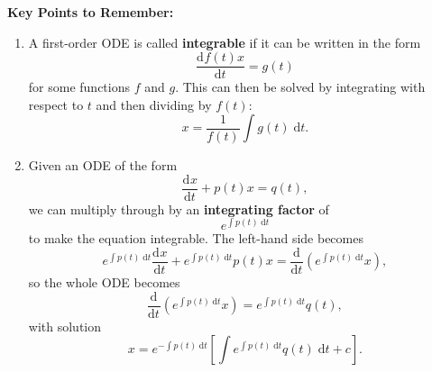 \documentclass{article}
\newcommand{\deriv}[3][]{\frac{\mathrm{d}^{#1}#2}{\mathrm{d}#3^{#1}}}
\newcommand{\diff}{\;\mathrm{d}}
\begin{document}
{\bf Key Points to Remember:}

\vspace{5mm}

\begin{enumerate}
	\item A first-order ODE is called \textbf{integrable} if it can be written in the form
		\[\deriv{f(t)x}{t} = g(t)\]
		for some functions $f$ and $g$. This can then be solved by integrating with respect to $t$ and then dividing by $f(t)$:
		\[x=\frac{1}{f(t)}\int g(t)\diff t.\]
	\item Given an ODE of the form
		\[\deriv{x}{t}+p(t)x=q(t),\]
		we can multiply through by an \textbf{integrating factor} of
		\[e^{\int\! p(t)\!\diff t}\]
		to make the equation integrable. The left-hand side becomes
		\[e^{\int\! p(t)\!\diff t}\deriv{x}{t}+e^{\int\! p(t)\!\diff t}p(t)x = \deriv{}{t}\left(e^{\int\! p(t)\!\diff t}x\right),\]
		so the whole ODE becomes
		\[\deriv{}{t}\left(e^{\int\! p(t)\!\diff t}x\right) = e^{\int\! p(t)\!\diff t} q(t),\]
		with solution
		\[x=e^{-\int\! p(t)\!\diff t}\left[\int e^{\int\! p(t)\!\diff t}q(t)\diff t+c\right].\]
\end{enumerate}
\end{document}
